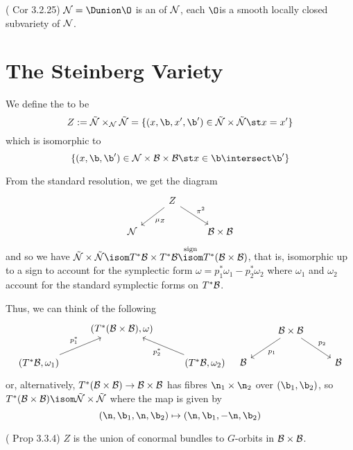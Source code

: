 \begin{cor}
  (\cite{cg} Cor 3.2.25) \(\cN = \Dunion \O\) is an  of \(\mathcal{N}\), each \(\O\)is a smooth locally closed
  subvariety of \(\mathcal{N}\).
\end{cor}
\section{The Steinberg Variety}
\begin{defn}
  We define the  to be \[
    Z := \tilde{\cN} \times_\cN \tilde{\cN} = \{(x,\b,x',\b') \in
    \tilde{\cN} \times \tilde{\cN} \st x = x'\}
  \]
  which is isomorphic to \[
    \{(x,\b,\b') \in \cN \times \cB \times \cB \st x \in \b \intersect
    \b'\}
  \]
\end{defn}
\begin{prop}
  From the standard resolution, we get the diagram \[
    \begin{tikzcd}
      & \ar[dl, "\mu_Z"] Z \ar[dr, "\pi^2"] & \\
      \cN & & \cB \times \cB
    \end{tikzcd}
  \]
  and so we have \(\tilde{\cN} \times \tilde{\cN} \isom T^* \cB \times
  T^* \cB \overset{\text{sign}}{\isom} T^*(\cB \times \cB)\), that is,
  isomorphic up to a sign to account for the symplectic form \(\omega
  = p_1^*
  \omega_1 - p_2^* \omega_2\) where \(\omega_1\) and \(\omega_2\)
  account for the standard symplectic forms on \(T^* \mathcal{B}\).
\end{prop}
Thus, we can think of the following \[
  \begin{tikzcd}
    & (T^*(\cB \times \cB), \omega) & \\
    (T^* \cB, \omega_1) \ar[ru, "p_1^*"]& & \ar[lu, "p_2^*"] (T^* \cB, \omega_2)
  \end{tikzcd} \ \
  \begin{tikzcd}
    & \ar[dl, "p_1"] \cB \times \cB \ar[dr, "p_2"] & \\
    \cB & & \cB
  \end{tikzcd}
\]
or, alternatively, \(T^*(\mathcal{B} \times \mathcal{B}) \to \mathcal{B} \times \mathcal{B}\) has
fibres \(\n_1 \times \n_2\) over \((\b_1, \b_2)\), so \(T^*(\cB \times
\cB) \isom \tilde{\cN} \times \tilde{\cN}\) where the map is given
by \[
  (\n, \b_1, \n, \b_2) \mapsto (\n,\b_1, -\n, \b_2)
\]
\begin{prop}
  (\cite{cg} Prop 3.3.4) \(Z\) is the union of conormal bundles to
  \(G\)-orbits in \(\mathcal{B} \times \mathcal{B}\).
\end{prop}

